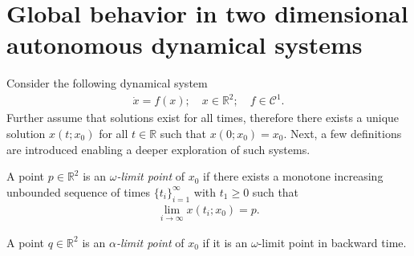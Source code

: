 \section{Global behavior in two dimensional autonomous dynamical systems}
Consider the following dynamical system
\begin{align}
	\dot{x} = f(x);\quad x \in \mathbb{R}^{2};\quad f \in \mathcal{C}^1.
\end{align}
Further assume that solutions exist for all times, therefore there exists a unique solution $x(t; x_0)$ for all $t \in \mathbb{R}$ such that $x(0;x_0)=x_0$. Next, a few definitions are introduced enabling a deeper exploration of such systems.

\begin{definition}
	A point $p \in \mathbb{R}^{2}$ is an \emph{$\omega$-limit point} of $x_0$ if there exists a monotone increasing unbounded sequence of times $\{t_i\}_{i=1}^{\infty}$ with $t_1 \geq 0$ such that 
	\begin{align}
		\lim_{i\to \infty}x(t_i;x_0)=p.
	\end{align}
\end{definition}

\begin{definition}
	A point $q \in \mathbb{R}^{2}$ is an \emph{$\alpha$-limit point} of $x_0$ if it is an $\omega $-limit point in backward time. 
\end{definition}

